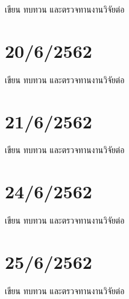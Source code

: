 เขียน ทบทวน และตรวจทานงานวิจัยต่อ

\section*{20/6/2562}

เขียน ทบทวน และตรวจทานงานวิจัยต่อ

\section*{21/6/2562}

เขียน ทบทวน และตรวจทานงานวิจัยต่อ

\section*{24/6/2562}

เขียน ทบทวน และตรวจทานงานวิจัยต่อ

\section*{25/6/2562}

เขียน ทบทวน และตรวจทานงานวิจัยต่อ